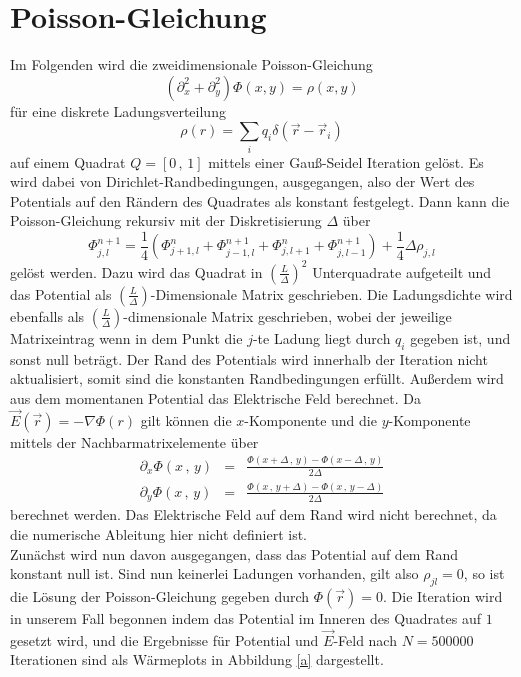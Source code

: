 \section{Poisson-Gleichung}
Im Folgenden wird die zweidimensionale Poisson-Gleichung 
\begin{equation}
\left(\partial_x^2+\partial_y^2\right)\Phi\left(x,y\right)=
\rho\left(x,y\right)\label{poisson}
\end{equation}
für eine diskrete Ladungsverteilung 
\begin{equation}
\rho\left(r\right)=\sum_i q_i \delta\left(\vec{r}-\vec{r}_i\right)
\end{equation}
auf einem Quadrat $Q=\left[0\,,\,1\right]$ mittels einer Gauß-Seidel Iteration gelöst. Es wird dabei von Dirichlet-Randbedingungen, ausgegangen, also der Wert des Potentials auf den Rändern des Quadrates als konstant festgelegt. Dann kann die Poisson-Gleichung rekursiv mit der Diskretisierung $\Delta$ über 
\begin{equation}
\Phi_{j,l}^{n+1}
=
\frac{1}{4}
\left(
\Phi_{j+1,l}^{n}
+\Phi_{j-1,l}^{n+1}
+\Phi_{j,l+1}^{n}
+\Phi_{j,l-1}^{n+1}
\right)
+\frac{1}{4}\Delta\rho_{j,l}
\end{equation}
gelöst werden. Dazu wird das Quadrat in $\left(\frac{L}{\Delta}\right)^2$ Unterquadrate aufgeteilt und das Potential als $\left(\frac{L}{\Delta}\right)$-Dimensionale Matrix geschrieben. Die Ladungsdichte wird ebenfalls als $\left(\frac{L}{\Delta}\right)$-dimensionale Matrix geschrieben, wobei der jeweilige Matrixeintrag wenn in dem Punkt die $j$-te Ladung liegt durch $q_i$ gegeben ist, und sonst null beträgt. Der Rand des Potentials wird innerhalb der Iteration nicht aktualisiert, somit sind die konstanten Randbedingungen erfüllt. Außerdem wird aus dem momentanen Potential das Elektrische Feld berechnet. Da $\vec{E}\left(\vec{r}\right)=-\nabla \Phi\left(r\right)$ gilt können die $x$-Komponente und die $y$-Komponente mittels der Nachbarmatrixelemente über 
\begin{eqnarray}
\partial_x\Phi\left(x\,,\,y\right)
&=&
\frac{\Phi\left(x+\Delta\,,\,y\right)-\Phi\left(x-\Delta\,,\,y\right)}{2\Delta}
\\
\partial_y\Phi\left(x\,,\,y\right)
&=&
\frac{\Phi\left(x\,,\,y+\Delta\right)-\Phi\left(x\,,\,y-\Delta\right)}{2\Delta}
\end{eqnarray}
berechnet werden. Das Elektrische Feld auf dem Rand wird nicht berechnet, da die numerische Ableitung hier nicht definiert ist.
\\
Zunächst wird nun davon ausgegangen, dass das Potential auf dem Rand konstant null ist. Sind nun keinerlei Ladungen vorhanden, gilt also $\rho_{jl}=0$, so ist die Lösung der Poisson-Gleichung gegeben durch $\Phi\left(\vec{r}\right)=0$. Die Iteration wird in unserem Fall begonnen indem das Potential im Inneren des Quadrates auf $1$ gesetzt wird, und die Ergebnisse für Potential und $\vec{E}$-Feld nach $N=500000$ Iterationen sind als Wärmeplots in Abbildung \ref{a} dargestellt.
